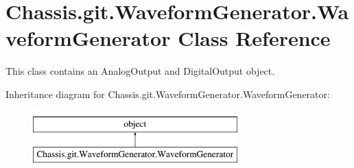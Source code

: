 \hypertarget{class_chassis_8git_1_1_waveform_generator_1_1_waveform_generator}{\section{Chassis.\-git.\-Waveform\-Generator.\-Waveform\-Generator Class Reference}
\label{class_chassis_8git_1_1_waveform_generator_1_1_waveform_generator}
}


This class contains an Analog\-Output and Digital\-Output object.  


Inheritance diagram for Chassis.\-git.\-Waveform\-Generator.\-Waveform\-Generator\-:\begin{figure}[H]
\begin{center}
\leavevmode
\includegraphics[height=2.000000cm]{class_chassis_8git_1_1_waveform_generator_1_1_waveform_generator}
\end{center}
\end{figure}
